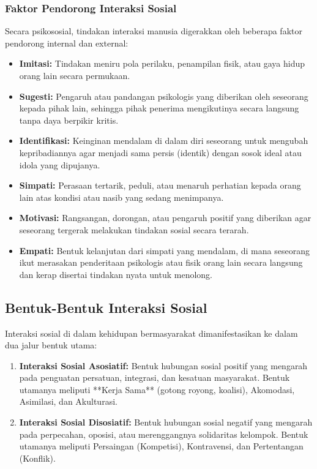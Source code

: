 \documentclass[12pt, a4paper]{article}
\begin{document}
\subsubsection{Faktor Pendorong Interaksi Sosial}
Secara psikososial, tindakan interaksi manusia digerakkan oleh beberapa faktor pendorong internal dan external:
\begin{itemize}
    \item \textbf{Imitasi:} Tindakan meniru pola perilaku, penampilan fisik, atau gaya hidup orang lain secara permukaan.
    \item \textbf{Sugesti:} Pengaruh atau pandangan psikologis yang diberikan oleh seseorang kepada pihak lain, sehingga pihak penerima mengikutinya secara langsung tanpa daya berpikir kritis.
    \item \textbf{Identifikasi:} Keinginan mendalam di dalam diri seseorang untuk mengubah kepribadiannya agar menjadi sama persis (identik) dengan sosok ideal atau idola yang dipujanya.
    \item \textbf{Simpati:} Perasaan tertarik, peduli, atau menaruh perhatian kepada orang lain atas kondisi atau nasib yang sedang menimpanya.
    \item \textbf{Motivasi:} Rangsangan, dorongan, atau pengaruh positif yang diberikan agar seseorang tergerak melakukan tindakan sosial secara terarah.
    \item \textbf{Empati:} Bentuk kelanjutan dari simpati yang mendalam, di mana seseorang ikut merasakan penderitaan psikologis atau fisik orang lain secara langsung dan kerap disertai tindakan nyata untuk menolong.
\end{itemize}

\subsection{Bentuk-Bentuk Interaksi Sosial}
Interaksi sosial di dalam kehidupan bermasyarakat dimanifestasikan ke dalam dua jalur bentuk utama:
\begin{enumerate}
    \item \textbf{Interaksi Sosial Asosiatif:} Bentuk hubungan sosial positif yang mengarah pada penguatan persatuan, integrasi, dan kesatuan masyarakat. Bentuk utamanya meliputi **Kerja Sama** (gotong royong, koalisi), Akomodasi, Asimilasi, dan Akulturasi.
    \item \textbf{Interaksi Sosial Disosiatif:} Bentuk hubungan sosial negatif yang mengarah pada perpecahan, oposisi, atau merenggangnya solidaritas kelompok. Bentuk utamanya meliputi Persaingan (Kompetisi), Kontravensi, dan Pertentangan (Konflik).
\end{enumerate}
\end{document}
